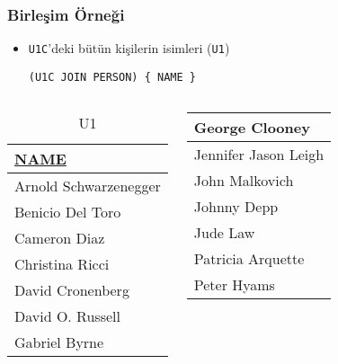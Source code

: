 \documentclass[dvipsnames]{beamer}
\theoremstyle{plain}
\begin{document}
\begin{frame}[fragile]
  \frametitle{Birleşim Örneği}

    \begin{itemize}
      \item \texttt{U1C}'deki bütün kişilerin isimleri (\texttt{U1})

    \begin{lstlisting}
(U1C JOIN PERSON) { NAME }
    \end{lstlisting}
    \end{itemize}

    \vspace{-10pt}
   \begin{columns}[b]
    \begin{tiny}
    \begin{table}
      \caption{U1}
      \begin{tabular}{|l|}\hline
\underline{NAME}     \\[2pt]\hline\hline
Arnold Schwarzenegger\\\hline
Benicio Del Toro     \\\hline
Cameron Diaz         \\\hline
Christina Ricci      \\\hline
David Cronenberg     \\\hline
David O. Russell     \\\hline
Gabriel Byrne        \\\hline
      \end{tabular}
    \end{table}
    \end{tiny}

    \begin{tiny}
    \begin{table}
      \begin{tabular}{|l|}\hline
George Clooney       \\\hline
Jennifer Jason Leigh \\\hline
John Malkovich       \\\hline
Johnny Depp          \\\hline
Jude Law             \\\hline
Patricia Arquette    \\\hline
Peter Hyams          \\\hline
      \end{tabular}
    \end{table}
    \end{tiny}


\end{columns}
\end{frame}
\end{document}

